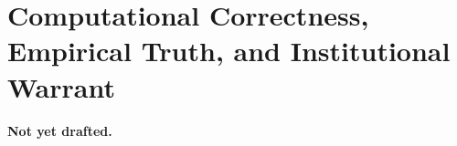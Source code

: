 \section{Computational Correctness, Empirical Truth, and Institutional Warrant}
\label{sec:correctness}


\textbf{Not yet drafted.}
